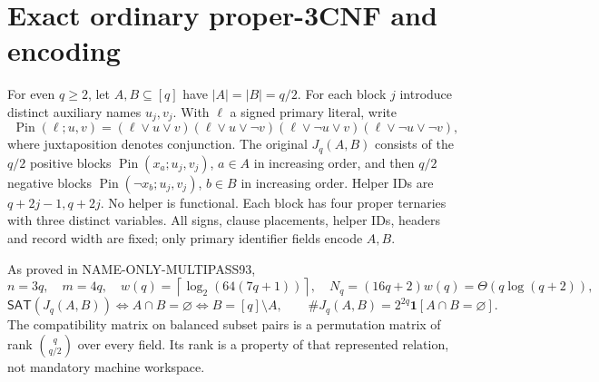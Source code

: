 \documentclass[11pt]{article}
\newcommand{\SAT}{\mathsf{SAT}}
\begin{document}
\section{Exact ordinary proper-3CNF and encoding}
For even \(q\ge2\), let \(A,B\subseteq[q]\) have \(|A|=|B|=q/2\). For each block \(j\) introduce distinct auxiliary names \(u_j,v_j\). With \(\ell\) a signed primary literal, write
\[
\operatorname{Pin}(\ell;u,v)=
(\ell\vee u\vee v)(\ell\vee u\vee\neg v)
(\ell\vee\neg u\vee v)(\ell\vee\neg u\vee\neg v),
\]
where juxtaposition denotes conjunction. The original \(J_q(A,B)\) consists of the \(q/2\) positive blocks \(\operatorname{Pin}(x_a;u_j,v_j)\), \(a\in A\) in increasing order, and then \(q/2\) negative blocks \(\operatorname{Pin}(\neg x_b;u_j,v_j)\), \(b\in B\) in increasing order. Helper IDs are \(q+2j-1,q+2j\). No helper is functional. Each block has four proper ternaries with three distinct variables. All signs, clause placements, helper IDs, headers and record width are fixed; only primary identifier fields encode \(A,B\).

As proved in NAME-ONLY-MULTIPASS93,
\[
 n=3q,\quad m=4q,\quad w(q)=\left\lceil\log_2(64(7q+1))\right\rceil,\quad
 N_q=(16q+2)w(q)=\Theta(q\log(q+2)),
\]
\[
 \SAT(J_q(A,B))\Longleftrightarrow A\cap B=\varnothing
 \Longleftrightarrow B=[q]\setminus A,
 \qquad
 \#J_q(A,B)=2^{2q}\mathbf1[A\cap B=\varnothing].
\]
The compatibility matrix on balanced subset pairs is a permutation matrix of rank \(\binom q{q/2}\) over every field. Its rank is a property of that represented relation, not mandatory machine workspace.
\end{document}
